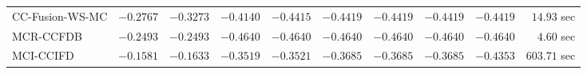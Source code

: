 \begin{table}[H]
\begin{tabular}{lrrrrrrrrr}
     CC-Fusion-WS-MC & $      -0.2767$ & $      -0.3273$ & $      -0.4140$ & $      -0.4415$ & $      -0.4419$ & $      -0.4419$ & $      -0.4419$ & $      -0.4419$ & $        14.93$ sec   \\ 
\cmidrule{1-1} 
           MCR-CCFDB & $      -0.2493$ & $      -0.2493$ & $      -0.4640$ & $      -0.4640$ & $      -0.4640$ & $      -0.4640$ & $      -0.4640$ & $      -0.4640$ & $         4.60$ sec   \\ 
\cmidrule{1-1} 
           MCI-CCIFD & $      -0.1581$ & $      -0.1633$ & $      -0.3519$ & $      -0.3521$ & $      -0.3685$ & $      -0.3685$ & $      -0.3685$ & $      -0.4353$ & $       603.71$ sec   \\ 
\bottomrule
\end{tabular}
\end{table}